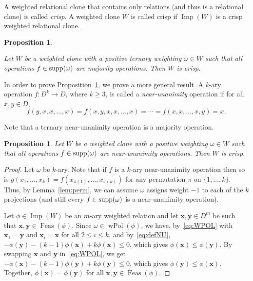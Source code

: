 \documentclass[11pt, reqno]{article}
\DeclareMathOperator{\wpol}{wPol}
\newcommand{\tup}[1]{\ensuremath{\mathbf #1}}
\DeclareMathOperator{\supp}{{\rm supp}}
\DeclareMathOperator{\dom}{{Feas}}
\DeclareMathOperator{\imp}{Imp}
\newtheorem{proposition}[theorem]{Proposition}
\theoremstyle{remark}
\begin{document}
A weighted relational clone that contains only relations (and thus is a
relational clone) is called \emph{crisp}. A weighted clone $W$ is called crisp
if $\imp(W)$ is a crisp weighted relational clone.

\begin{proposition}\label{prop:majority}

Let $W$ be a weighted clone with a positive ternary weighting $\omega\in W$ such that all
operations $f\in\supp(\omega)$ are majority operations. Then $W$ is
crisp.

\end{proposition}


In order to prove Proposition~\ref{prop:majority}, we prove a more general
result. A $k$-ary operation $f:D^k\to D$, where $k\geq 3$, is called a
\emph{near-unanimity} operation if for all $x,y\in D$,
\begin{equation}\label{eq:defNU}
f(y,x,x,\ldots,x)=f(x,y,x,x,\ldots,x)=\cdots=f(x,x,\ldots,x,y)=x\,.
\end{equation}

Note that a ternary near-unanimity operation is a majority operation.

\begin{proposition}\label{prop:NU}
Let $W$ be a weighted clone with a positive weighting $\omega\in W$ such that all
operations $f\in\supp(\omega)$ are near-unanimity operations. Then $W$ is crisp.
\end{proposition}
\begin{proof}
%
Let $\omega$ be $k$-ary. Note that if $f$ is a $k$-ary near-unanimity operation
then so is $g(x_1,\ldots,x_k)=f(x_{\pi(1)},\ldots,x_{\pi(k)})$ for any
permutation $\pi$ on $\{1,\ldots,k\}$. Thus, by Lemma~\ref{lem:perm}, we can
assume $\omega$ assigns weight $-1$ to each of the $k$ projections (and still every
$f\in\supp(\omega)$ is a near-unanimity operation).

Let $\phi\in\imp(W)$ be an $m$-ary weighted relation and let
$\tup{x},\tup{y}\in D^m$ be such that $\tup{x},\tup{y}\in\dom(\phi)$. 
%
Since $\omega\in\wpol(\phi)$, we have, by~\eqref{eq:WPOL} with
$\tup{x}_1=\tup{y}$ and $\tup{x}_i=\tup{x}$ for all $2\leq i\leq k$, and by~\eqref{eq:defNU},
%
$-\phi(\tup{y})-(k-1)\phi(\tup{x})+k\phi(\tup{x})\leq 0$, which gives $\phi(\tup{x})\leq\phi(\tup{y})$. By swapping
$\tup{x}$ and $\tup{y}$ in~\eqref{eq:WPOL}, we get
$-\phi(\tup{x})-(k-1)\phi(\tup{y})+k\phi(\tup{y})\leq 0$, which gives
$\phi(\tup{y})\leq\phi(\tup{x})$. Together, $\phi(\tup{x})=\phi(\tup{y})$ for all
$\tup{x},\tup{y}\in\dom(\phi)$. 
%
\end{proof}
\end{document}
